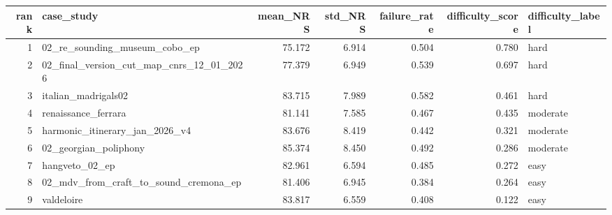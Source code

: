 \begin{tabular}{rlrrrrl}
\toprule
rank & case\_study & mean\_NRS & std\_NRS & failure\_rate & difficulty\_score & difficulty\_label \\
\midrule
1 & 02\_re\_sounding\_museum\_cobo\_ep & 75.172 & 6.914 & 0.504 & 0.780 & hard \\
2 & 02\_final\_version\_cut\_map\_cnrs\_12\_01\_2026 & 77.379 & 6.949 & 0.539 & 0.697 & hard \\
3 & italian\_madrigals02 & 83.715 & 7.989 & 0.582 & 0.461 & hard \\
4 & renaissance\_ferrara & 81.141 & 7.585 & 0.467 & 0.435 & moderate \\
5 & harmonic\_itinerary\_jan\_2026\_v4 & 83.676 & 8.419 & 0.442 & 0.321 & moderate \\
6 & 02\_georgian\_poliphony & 85.374 & 8.450 & 0.492 & 0.286 & moderate \\
7 & hangveto\_02\_ep & 82.961 & 6.594 & 0.485 & 0.272 & easy \\
8 & 02\_mdv\_from\_craft\_to\_sound\_cremona\_ep & 81.406 & 6.945 & 0.384 & 0.264 & easy \\
9 & valdeloire & 83.817 & 6.559 & 0.408 & 0.122 & easy \\
\bottomrule
\end{tabular}

